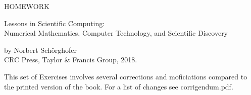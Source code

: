 \documentclass{article}
\begin{document}
\begin{center}
{\Large
  HOMEWORK
  \vspace{1em}

Lessons in Scientific Computing:\\
Numerical Mathematics, Computer Technology, and Scientific Discovery 
}
\vspace{1em}

by Norbert Sch\"orghofer\\
CRC Press, Taylor \& Francis Group, 2018.\\
\end{center}

\vspace{10cm}\noindent
This set of Exercises involves several corrections and moficiations compared to the printed version of the book.
For a list of changes see corrigendum.pdf.





\newpage
\end{document}
